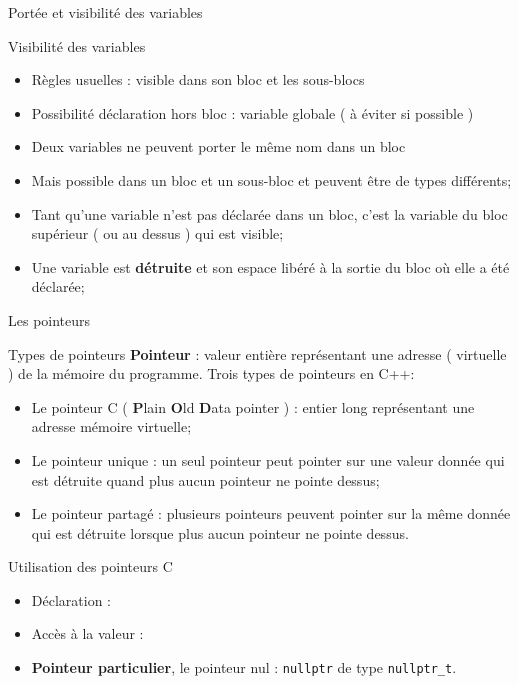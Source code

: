 \documentclass[handout,10pt]{beamer}
\newcommand{\includepartcode}[4][cpp]{

}
\begin{document}
\begin{frame}[fragile]{Portée et visibilité des variables}
\tiny

\begin{block}{Visibilité des variables}
\begin{itemize}
\item Règles usuelles : visible dans son bloc et les sous-blocs
\item Possibilité déclaration hors bloc : variable globale ( à éviter si possible )
\item Deux variables ne peuvent porter le même nom dans un bloc
\item Mais possible dans un bloc et un sous-bloc et peuvent être de types différents;
\item Tant qu'une variable n'est pas déclarée dans un bloc, c'est la variable du bloc
supérieur ( ou au dessus ) qui est visible;
\item Une variable est \textbf{détruite} et son espace libéré à la sortie du bloc où elle a été déclarée;
\end{itemize}
\end{block}
\includepartcode{visibilite.cpp}{3}{14}
\end{frame}


\begin{frame}[fragile]{Les pointeurs}
\tiny
\begin{block}{Types de pointeurs}
\textbf{Pointeur} : valeur entière représentant une adresse ( virtuelle ) de la mémoire du programme.
Trois types de pointeurs en C++:
\begin{itemize}
\item {\color{blue}Le pointeur C} ( {\bf P}lain {\bf O}ld {\bf D}ata pointer ) : entier long représentant une adresse mémoire virtuelle;
\item {\color{blue}Le pointeur unique} : {\color{red} un seul pointeur} peut pointer sur {\color{red}une valeur donnée} qui est détruite quand plus aucun pointeur ne pointe dessus;
\item {\color{blue}Le pointeur partagé} : {\color{red}plusieurs pointeurs} peuvent pointer sur la {\color{red}même donnée} qui est détruite lorsque plus aucun pointeur ne pointe dessus.
\end{itemize}
\end{block}

\begin{block}{Utilisation des pointeurs C}
\begin{itemize}
\item Déclaration :
\includepartcode{pointeurs.cpp}{7}{13}
\item Accès à la valeur :
\includepartcode{pointeurs.cpp}{17}{18}
\item \textbf{Pointeur particulier}, le pointeur nul : \lstinline$nullptr$ de type \lstinline$nullptr_t$.
\end{itemize}
\end{block}
\end{frame}
\end{document}
